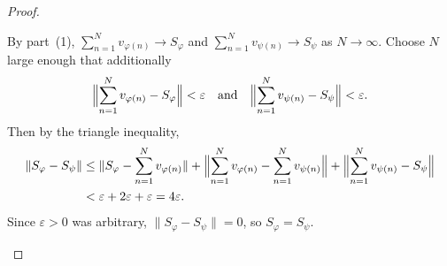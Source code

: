 \begin{proof}
\begin{enumerate}
        By part~(1), $\sum_{n=1}^N v_{\varphi(n)} \to S_\varphi$ and $\sum_{n=1}^N v_{\psi(n)} \to S_\psi$ as $N \to \infty$. Choose $N$ large enough that additionally
        $$\Bigl\|\sum_{n=1}^N v_{\varphi(n)} - S_\varphi\Bigr\| < \varepsilon \quad\text{and}\quad \Bigl\|\sum_{n=1}^N v_{\psi(n)} - S_\psi\Bigr\| < \varepsilon.$$
        Then by the triangle inequality,
        \begin{align*}
        \|S_\varphi - S_\psi\|
        &\leq \|S_\varphi - \sum_{n=1}^N v_{\varphi(n)}\|
           + \Bigl\|\sum_{n=1}^N v_{\varphi(n)} - \sum_{n=1}^N v_{\psi(n)}\Bigr\|
           + \Bigl\|\sum_{n=1}^N v_{\psi(n)} - S_\psi\Bigr\| \\
        &< \varepsilon + 2\varepsilon + \varepsilon = 4\varepsilon.
        \end{align*}
        Since $\varepsilon > 0$ was arbitrary, $\|S_\varphi - S_\psi\| = 0$, so $S_\varphi = S_\psi$.
    \end{enumerate}
\end{proof}